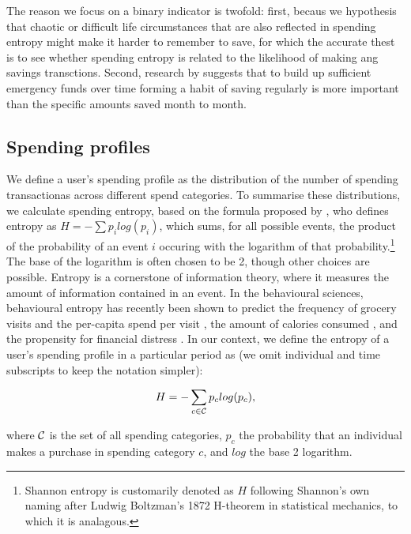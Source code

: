 The reason we focus on a binary indicator is twofold: first, becaus we
hypothesis that chaotic or difficult life circumstances that are also reflected
in spending entropy might make it harder to remember to save, for which the
accurate thest is to see whether spending entropy is related to the likelihood
of making ang savings transctions. Second, research by \citet{mps2018building}
suggests that to build up sufficient emergency funds over time forming a habit
of saving regularly is more important than the specific amounts saved month to
month.

\subsection{Spending profiles}%
\label{sub:spending_profiles}

We define a user's spending profile as the distribution of the number of
spending transactionas across different spend categories. To summarise these
distributions, we calculate spending entropy, based on the formula proposed by
\citet{shannon1948mathematical}, who defines entropy as $H =
-\sum{p_i}log(p_i)$, which sums, for all possible events, the product of the
probability of an event $i$ occuring with the logarithm of that
probability.\footnote{Shannon entropy is customarily denoted as $H$ following
Shannon's own naming after Ludwig Boltzman's 1872 H-theorem in statistical
mechanics, to which it is analagous.} The base of the logarithm is often chosen
to be 2, though other choices are possible. Entropy is a cornerstone of
information theory, where it measures the amount of information contained in an
event. In the behavioural sciences, behavioural entropy has recently been shown
to predict the frequency of grocery visits and the per-capita spend per visit
\citep{guidotti2015behavioral}, the amount of calories consumed
\citep{skatova2019those}, and the propensity for financial distress
\citep{muggleton2020evidence}. In our context, we define the entropy of a
user's spending profile in a particular period as (we omit individual and time
subscripts to keep the notation simpler):

\begin{equation}
\label{equ:entropy}
H = -\sum_{c \in \mathcal{C}}{p_c}log(p_c),
\end{equation}

\noindent where $\mathcal{C}$ is the set of all spending categories, $p_c$ the
probability that an individual makes a purchase in spending category $c$, and
$log$ the base 2 logarithm.

